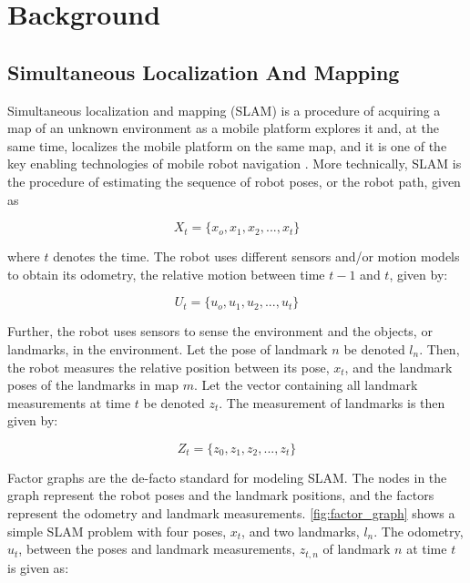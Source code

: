 \chapter{Background}

\section{Simultaneous Localization And Mapping}

Simultaneous localization and mapping (SLAM) is a procedure of acquiring a map of an unknown environment as a mobile platform explores it and, at the same time, localizes the mobile platform on the same map, and it is one of the key enabling technologies of mobile robot navigation \cite{Stachniss2016SimultaneousMapping}. More technically, SLAM is the procedure of estimating the sequence of robot poses, or the robot path, given as  

\begin{equation}
    X_t = \{x_o, x_1, x_2,...,x_t\}
    \label{eq:path}
\end{equation}

where $t$ denotes the time. The robot uses different sensors and/or motion models to obtain its odometry, the relative motion between time $t-1$ and $t$, given by:

\begin{equation}
    U_t = \{u_o, u_1, u_2,...,u_t\}
    \label{eq:odom}
\end{equation}

Further, the robot uses sensors to sense the environment and the objects, or landmarks, in the environment. Let the pose of landmark $n$ be denoted $l_n$. Then, the robot measures the relative position between its pose, $x_t$, and the landmark poses of the landmarks in map $m$. Let the vector containing all landmark measurements at time $t$ be denoted $z_t$. The measurement of landmarks is then given by:

\begin{equation}
    Z_t = \{z_0, z_1, z_2,...,z_t\}
    \label{eq:landmark_measurements}
\end{equation}

Factor graphs are the de-facto standard for modeling SLAM. The nodes in the graph represent the robot poses and the landmark positions, and the factors represent the odometry and landmark measurements. \cref{fig:factor_graph} shows a simple SLAM problem with four poses, $x_t$, and two landmarks, $l_n$. The odometry, $u_t$, between the poses and landmark measurements, $z_{t,n}$ of landmark $n$ at time $t$ is given as:

